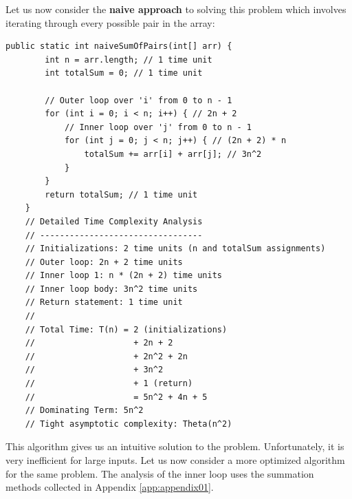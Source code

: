 Let us now consider the \textbf{naive approach} to solving this problem which involves iterating through every possible pair in the array:

\begin{lstlisting}[style = javaStyle, caption={Naive Sum of Pairs with Analysis}, label={lst:java_naive_sum_pairs_analysis}]
    public static int naiveSumOfPairs(int[] arr) {
        int n = arr.length; // 1 time unit
        int totalSum = 0; // 1 time unit

        // Outer loop over 'i' from 0 to n - 1
        for (int i = 0; i < n; i++) { // 2n + 2
            // Inner loop over 'j' from 0 to n - 1
            for (int j = 0; j < n; j++) { // (2n + 2) * n
                totalSum += arr[i] + arr[j]; // 3n^2
            }
        }
        return totalSum; // 1 time unit
    }
    // Detailed Time Complexity Analysis
    // ---------------------------------
    // Initializations: 2 time units (n and totalSum assignments)
    // Outer loop: 2n + 2 time units
    // Inner loop 1: n * (2n + 2) time units
    // Inner loop body: 3n^2 time units
    // Return statement: 1 time unit
    //
    // Total Time: T(n) = 2 (initializations)
    //                    + 2n + 2
    //                    + 2n^2 + 2n
    //                    + 3n^2
    //                    + 1 (return)
    //                    = 5n^2 + 4n + 5
    // Dominating Term: 5n^2
    // Tight asymptotic complexity: Theta(n^2)
\end{lstlisting}

This algorithm gives us an intuitive solution to the problem. Unfortunately, it is very inefficient for large inputs. Let us now consider a more optimized algorithm for the same problem. The analysis of the inner loop uses the summation methods collected in Appendix \ref{app:appendix01}.

